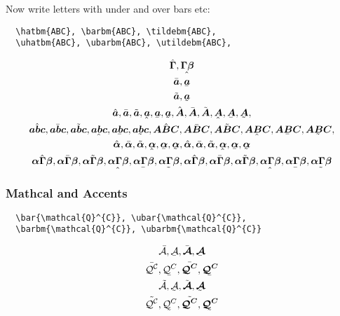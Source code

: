 \documentclass[12pt,english]{article}
\begin{document}
Now write letters with under and over bars etc:

\begin{verbatim}
  \hatbm{ABC}, \barbm{ABC}, \tildebm{ABC},
  \uhatbm{ABC}, \ubarbm{ABC}, \utildebm{ABC},
\end{verbatim}
\begin{align}
    \begin{gathered}
      \hatbm{\Gamma}, \uhatbm{\Gamma\beta}\\
      \barbm{a}, \ubarbm{a}\\
      \tildebm{a}, \utildebm{a}\\
      \hatbm{a}, \barbm{a}, \tildebm{a}, \uhatbm{a}, \ubarbm{a}, \utildebm{a},
      \hatbm{A}, \barbm{A}, \tildebm{A}, \uhatbm{A}, \ubarbm{A}, \utildebm{A},
      \\
      \hatbm{abc}, \barbm{abc}, \tildebm{abc}, \uhatbm{abc}, \ubarbm{abc}, \utildebm{abc},
      \hatbm{ABC}, \barbm{ABC}, \tildebm{ABC}, \uhatbm{ABC}, \ubarbm{ABC}, \utildebm{ABC},
      \\
      \hatbm{\alpha}, \barbm{\alpha}, \tildebm{\alpha}, \uhatbm{\alpha}, \ubarbm{\alpha}, \utildebm{\alpha},
      \hatbm{\alpha}, \barbm{\alpha}, \tildebm{\alpha}, \uhatbm{\alpha}, \ubarbm{\alpha}, \utildebm{\alpha}\\
      \hatbm{\alpha\Gamma\beta}, \barbm{\alpha\Gamma\beta}, \tildebm{\alpha\Gamma\beta}, \uhatbm{\alpha\Gamma\beta}, \ubarbm{\alpha\Gamma\beta}, \utildebm{\alpha\Gamma\beta},
      \hatbm{\alpha\Gamma\beta}, \barbm{\alpha\Gamma\beta}, \tildebm{\alpha\Gamma\beta}, \uhatbm{\alpha\Gamma\beta}, \ubarbm{\alpha\Gamma\beta}, \utildebm{\alpha\Gamma\beta}\\
    \end{gathered}
\end{align}

\subsubsection{Mathcal and Accents}

\begin{verbatim}
  \bar{\mathcal{Q}^{C}}, \ubar{\mathcal{Q}^{C}},
  \barbm{\mathcal{Q}^{C}}, \ubarbm{\mathcal{Q}^{C}}
\end{verbatim}
\begin{align}
    \begin{gathered}
      \bar{\mathcal{A}}, \ubar{\mathcal{A}},
      \barbm{\mathcal{A}}, \ubarbm{\mathcal{A}}\\
      \bar{\mathcal{Q}^{C}}, \ubar{\mathcal{Q}^{C}},
      \barbm{\mathcal{Q}^{C}}, \ubarbm{\mathcal{Q}^{C}}\\
      \tilde{\mathcal{A}}, \utilde{\mathcal{A}},
      \tildebm{\mathcal{A}}, \utildebm{\mathcal{A}}\\
      \tilde{\mathcal{Q}^{C}}, \utilde{\mathcal{Q}^{C}},
      \tildebm{\mathcal{Q}^{C}}, \utildebm{\mathcal{Q}^{C}}\\
    \end{gathered}
\end{align}
\end{document}
